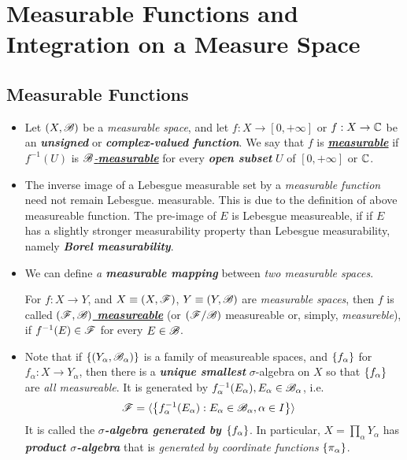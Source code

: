 \documentclass[11pt]{article}
\begin{document}
\newpage
\section{Measurable Functions and Integration on a Measure Space}
\subsection{Measurable Functions}
\begin{itemize}
\item \begin{definition}
Let $(X, {\mathscr B})$ be a \emph{measurable space}, and let $f : X \rightarrow [0, +\infty]$ or $f: X \rightarrow {\mathbb C}$ be an \emph{\textbf{unsigned}} or \emph{\textbf{complex-valued function}}. We say that $f$ is \underline{\emph{\textbf{measurable}}} if $f^{-1}(U)$ is \underline{\emph{${\mathscr B}$-\textbf{measurable}}} for every \emph{\textbf{open subset}} $U$ of $[0, +\infty]$ or ${\mathbb C}$.
\end{definition}

\item \begin{remark}
The inverse image of a Lebesgue measurable set by a \emph{measurable function} need not remain Lebesgue. measurable. This is due to the definition of above measureable function. The pre-image of $E$ is Lebesgue measureable, if if $E$ has a slightly stronger measurability property than Lebesgue measurability, namely \emph{\textbf{Borel measurability}}.
\end{remark}

\item We can define \emph{a \textbf{measurable mapping}} between \emph{two measurable spaces}.
\begin{definition}
For $f: X\rightarrow Y$, and $X\equiv (X, {\mathscr F})$, $Y\equiv (Y, {\mathscr B})$ are \emph{measurable spaces}, then $f$ is called \underline{\emph{\textbf{$({\mathscr F}, {\mathscr B})$ measureable}}} (or $({\mathscr F}/{\mathscr B})$ measureable or, simply, \emph{measureble}), if $f^{-1}(E) \in {\mathscr F}$ for every $E\in {\mathscr B}$.
\end{definition}


\item  \begin{definition} 
Note that if $\left\{(Y_{\alpha}, {\mathscr B}_{\alpha})\right\}$ is a family of measureable spaces, and $\left\{f_{\alpha}\right\}$ for $f_{\alpha}: X\rightarrow Y_{\alpha}$, then there is a \emph{\textbf{unique smallest}} $\sigma$-algebra on $X$ so that $\left\{f_{\alpha}\right\}$ are \emph{all measureable}. It is generated by $f_{\alpha}^{-1}(E_{\alpha}), E_{\alpha}\in {\mathscr B}_{\alpha}$, i.e.
\begin{align*}
{\mathscr F} &= \langle \left\{f_{\alpha}^{-1}(E_{\alpha}): E_{\alpha}\in {\mathscr B}_{\alpha}, \alpha \in I\right\} \rangle
\end{align*} It is called the \emph{\textbf{$\sigma$-algebra generated by $\left\{f_{\alpha}\right\}$}}.  In particular, $X= \prod_{\alpha}Y_{\alpha}$ has \emph{\textbf{product $\sigma$-algebra}} that is \emph{generated by coordinate functions} $\left\{\pi_{\alpha}\right\}$.
\end{definition}


\end{itemize}
\end{document}
